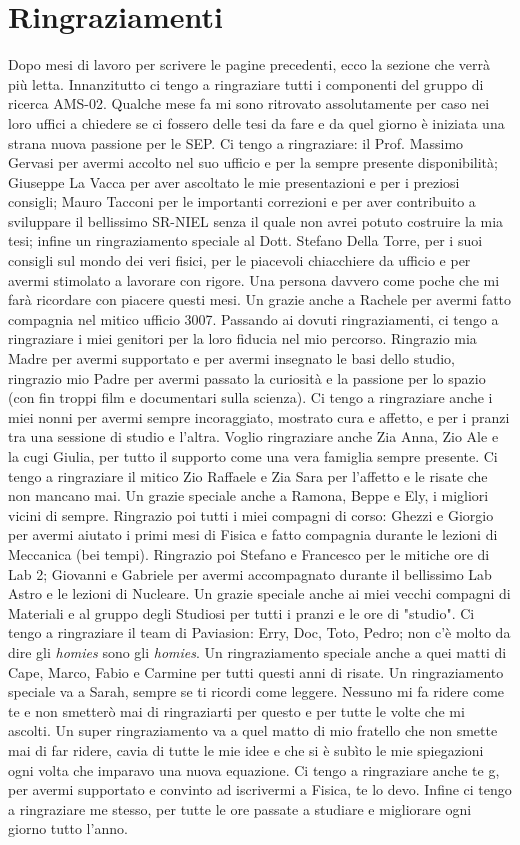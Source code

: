 \documentclass[12pt]{report}
\begin{document}
\chapter{Ringraziamenti}
Dopo mesi di lavoro per scrivere le pagine precedenti, ecco la sezione che verrà più letta. Innanzitutto ci tengo a ringraziare tutti i componenti del gruppo di ricerca AMS-02. Qualche mese fa mi sono ritrovato assolutamente per caso nei loro uffici a chiedere se ci fossero delle tesi da fare e da quel giorno è iniziata una strana nuova passione per le SEP. Ci tengo a ringraziare: il Prof. Massimo Gervasi per avermi accolto nel suo ufficio e per la sempre presente disponibilità; Giuseppe La Vacca per aver ascoltato le mie presentazioni e per i preziosi consigli; Mauro Tacconi per le importanti correzioni e per aver contribuito a sviluppare il bellissimo SR-NIEL senza il quale non avrei potuto costruire la mia tesi; infine un ringraziamento speciale al Dott. Stefano Della Torre, per i suoi consigli sul mondo dei veri fisici, per le piacevoli chiacchiere da ufficio e per avermi stimolato a lavorare con rigore. Una persona davvero come poche che mi farà ricordare con piacere questi mesi. Un grazie anche a Rachele per avermi fatto compagnia nel mitico ufficio 3007. 
Passando ai dovuti ringraziamenti, ci tengo a ringraziare i miei genitori per la loro fiducia nel mio percorso. Ringrazio mia Madre per avermi supportato e per avermi insegnato le basi dello studio, ringrazio mio Padre per avermi passato la curiosità e la passione per lo spazio (con fin troppi film e documentari sulla scienza).
Ci tengo a ringraziare anche i miei nonni per avermi sempre incoraggiato, mostrato cura e affetto, e per i pranzi tra una sessione di studio e l'altra. Voglio ringraziare anche Zia Anna, Zio Ale e la cugi Giulia, per tutto il supporto come una vera famiglia sempre presente. Ci tengo a ringraziare il mitico Zio Raffaele e Zia Sara per l'affetto e le risate che non mancano mai. Un grazie speciale anche a Ramona, Beppe e Ely, i migliori vicini di sempre. 
Ringrazio poi tutti i miei compagni di corso: Ghezzi e Giorgio per avermi aiutato i primi mesi di Fisica e fatto compagnia durante le lezioni di Meccanica (bei tempi). Ringrazio poi Stefano e Francesco per le mitiche ore di Lab 2; Giovanni e Gabriele per avermi accompagnato durante il bellissimo Lab Astro e le lezioni di Nucleare. Un grazie speciale anche ai miei vecchi compagni di Materiali e al gruppo degli Studiosi per tutti i pranzi e le ore di "studio". Ci tengo a ringraziare il team di Paviasion: Erry, Doc, Toto, Pedro; non c'è molto da dire gli \textit{homies} sono gli \textit{homies}. Un ringraziamento speciale anche a quei matti di Cape, Marco, Fabio e Carmine per tutti questi anni di risate. Un ringraziamento speciale va a Sarah, sempre se ti ricordi come leggere. Nessuno mi fa ridere come te e non smetterò mai di ringraziarti per questo e per tutte le volte che mi ascolti.
Un super ringraziamento va a quel matto di mio fratello che non smette mai di far ridere, cavia di tutte le mie idee e che si è subìto le mie spiegazioni ogni volta che imparavo una nuova equazione. Ci tengo a ringraziare anche te g, per avermi supportato e convinto ad iscrivermi a Fisica, te lo devo.
Infine ci tengo a ringraziare me stesso, per tutte le ore passate a studiare e migliorare ogni giorno tutto l'anno. 
\end{document}
